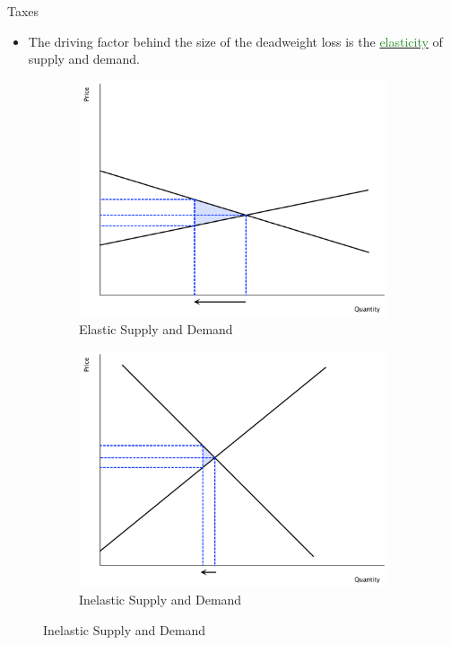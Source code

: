 \documentclass[xcolor={dvipsnames},pdf, hyperref={colorlinks=true, citecolor=ForestGreen, linkcolor=BlueViolet, urlcolor=Magenta}]{beamer}
\newcommand{\dd}[1]{{\underline{\textcolor{ForestGreen}{#1}}}}
\begin{document}
\begin{frame}{Taxes}
	\begin{itemize}
		\item The driving factor behind the size of the deadweight loss is the \dd{elasticity} of supply and demand. 
	\end{itemize}
	\begin{figure}[H]
		\centering
		\caption{Taxes, Elasticity, and DWL}
		\begin{subfigure}{.5\textwidth}
			\includegraphics[scale=.25]{plot45.pdf}
			\caption{Elastic Supply and Demand}
		\end{subfigure}%
		\begin{subfigure}{.5\textwidth}
			\centering
		\includegraphics[scale=.25]{plot46.pdf}
			\caption{Inelastic Supply and Demand}
		\end{subfigure}
	\end{figure}
	
\end{frame}
\end{document}
